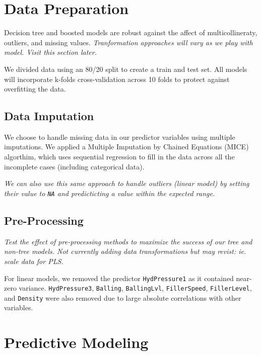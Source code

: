 \documentclass[]{report}
\begin{document}
\hypertarget{data-preparation}{%
\chapter{Data Preparation}\label{data-preparation}}

Decision tree and boosted models are robust against the affect of
multicollineraty, outliers, and missing values. \emph{Tranformation
approaches will vary as we play with model. Visit this section later.}

We divided data using an 80/20 split to create a train and test set. All
models will incorporate k-folds cross-validation across 10 folds to
protect against overfitting the data.

\hypertarget{data-imputation}{%
\section{Data Imputation}\label{data-imputation}}

We choose to handle missing data in our predictor variables using
multiple imputations. We applied a Multiple Imputation by Chained
Equations (MICE) algorthim, which uses sequential regression to fill in
the data across all the incomplete cases (including categorical data).

\emph{We can also use this same approach to handle outliers (linear
model) by setting their value to \texttt{NA} and predicticting a value
within the expected range.}

\hypertarget{pre-processing}{%
\section{Pre-Processing}\label{pre-processing}}

\emph{Test the effect of pre-processing methods to maximize the success
of our tree and non-tree models. Not currently adding data
transformations but may revist: ie. scale data for PLS. }

For linear models, we removed the predictor \texttt{HydPressure1} as it
contained near-zero variance. \texttt{HydPressure3}, \texttt{Balling},
\texttt{BallingLvl}, \texttt{FillerSpeed}, \texttt{FillerLevel}, and
\texttt{Density} were also removed due to large absolute correlations
with other variables.

\hypertarget{predictive-modeling}{%
\chapter{Predictive Modeling}\label{predictive-modeling}}
\end{document}
